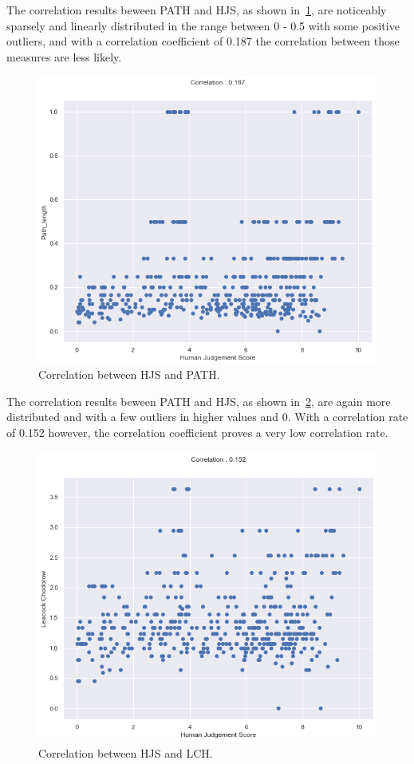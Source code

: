 \documentclass[conference]{IEEEtran}
\begin{document}
The correlation results beween PATH and HJS, as shown in~\ref{fig:pathcorr}, are noticeably sparsely and linearly distributed in the range between 0 - 0.5 with some positive outliers, and with a correlation coefficient of 0.187 the correlation between those measures are less likely.

\begin{figure}[h]
\centerline{\includegraphics[scale=0.5]{img/pathcorr.png}}
\caption{Correlation between HJS and PATH.}
\label{fig:pathcorr}
\end{figure}

The correlation results beween PATH and HJS, as shown in~\ref{fig:lchcorr}, are again more distributed and with a few outliers in higher values and 0. With a correlation rate of 0.152 however, the correlation coefficient proves a very low correlation rate.

\begin{figure}[h]
\centerline{\includegraphics[scale=0.5]{img/lchcorr.png}}
\caption{Correlation between HJS and LCH.}
\label{fig:lchcorr}
\end{figure}
\end{document}
